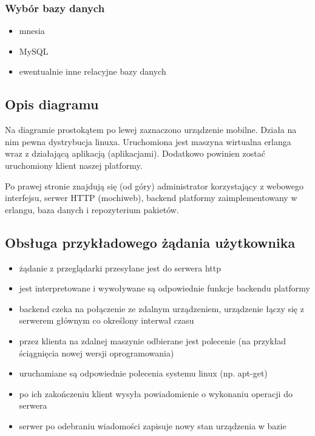 \documentclass[polish,12pt]{aghthesis}
\begin{document}
\subsubsection {Wybór bazy danych}
\begin{itemize}
\item mnesia
\item MySQL
\item ewentualnie inne relacyjne bazy danych
\end{itemize}

\centerline{
}

\subsection{Opis diagramu}
Na diagramie prostokątem po lewej zaznaczono urządzenie mobilne. Działa na nim pewna dystrybucja linuxa. Uruchomiona jest maszyna wirtualna erlanga wraz z działającą aplikacją (aplikacjami). Dodatkowo powinien zostać uruchomiony klient naszej platformy.

Po prawej stronie znajdują się (od góry) administrator korzystający z webowego interfejsu, serwer HTTP (mochiweb), backend platformy zaimplementowany w erlangu, baza danych i repozyterium pakietów.

\subsection{Obsługa przykładowego żądania użytkownika}
\begin{itemize}
\item żądanie z przeglądarki przesyłane jest do serwera http
\item jest interpretowane i wywoływane są odpowiednie funkcje backendu platformy
\item backend czeka na połączenie ze zdalnym urządzeniem, urządzenie łączy się z serwerem głównym co określony interwał czasu
\item przez klienta na zdalnej maszynie odbierane jest polecenie (na przykład ściągnięcia nowej wersji oprogramowania)
\item uruchamiane są odpowiednie polecenia systemu linux (np. apt-get)
\item po ich zakończeniu klient wysyła powiadomienie o wykonaniu operacji do serwera
\item serwer po odebraniu wiadomości zapisuje nowy stan urządzenia w bazie
\end{itemize}
\end{document}
